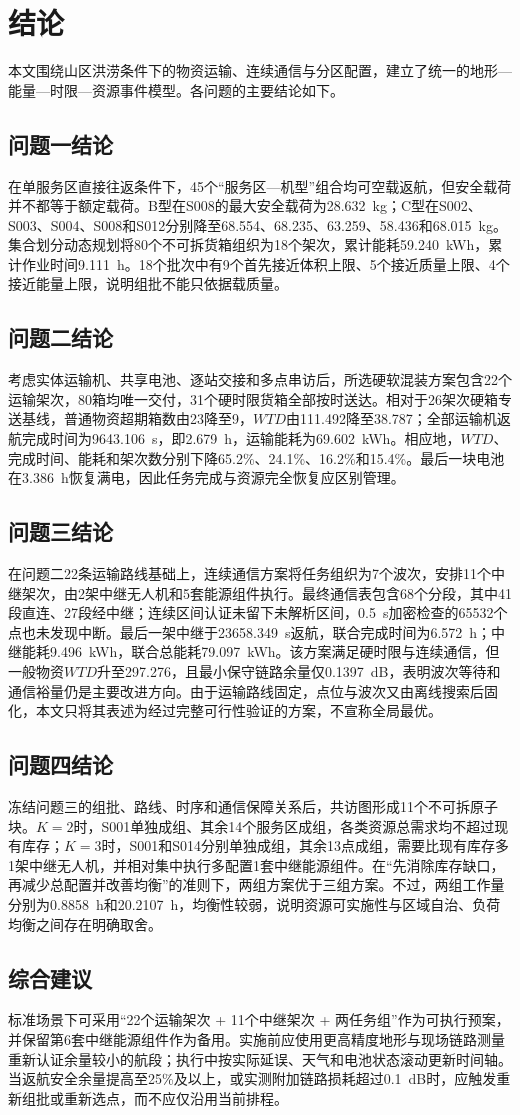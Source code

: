 \section{结论}
本文围绕山区洪涝条件下的物资运输、连续通信与分区配置，建立了统一的地形—能量—时限—资源事件模型。各问题的主要结论如下。

\subsection{问题一结论}
在单服务区直接往返条件下，45个“服务区—机型”组合均可空载返航，但安全载荷并不都等于额定载荷。B型在S008的最大安全载荷为28.632~kg；C型在S002、S003、S004、S008和S012分别降至68.554、68.235、63.259、58.436和68.015~kg。集合划分动态规划将80个不可拆货箱组织为18个架次，累计能耗59.240~kWh，累计作业时间9.111~h。18个批次中有9个首先接近体积上限、5个接近质量上限、4个接近能量上限，说明组批不能只依据载质量。

\subsection{问题二结论}
考虑实体运输机、共享电池、逐站交接和多点串访后，所选硬软混装方案包含22个运输架次，80箱均唯一交付，31个硬时限货箱全部按时送达。相对于26架次硬箱专送基线，普通物资超期箱数由23降至9，$WTD$由111.492降至38.787；全部运输机返航完成时间为9643.106~s，即2.679~h，运输能耗为69.602~kWh。相应地，$WTD$、完成时间、能耗和架次数分别下降65.2\%、24.1\%、16.2\%和15.4\%。最后一块电池在3.386~h恢复满电，因此任务完成与资源完全恢复应区别管理。

\subsection{问题三结论}
在问题二22条运输路线基础上，连续通信方案将任务组织为7个波次，安排11个中继架次，由2架中继无人机和5套能源组件执行。最终通信表包含68个分段，其中41段直连、27段经中继；连续区间认证未留下未解析区间，0.5~s加密检查的65532个点也未发现中断。最后一架中继于23658.349~s返航，联合完成时间为6.572~h；中继能耗9.496~kWh，联合总能耗79.097~kWh。该方案满足硬时限与连续通信，但一般物资$WTD$升至297.276，且最小保守链路余量仅0.1397~dB，表明波次等待和通信裕量仍是主要改进方向。由于运输路线固定，点位与波次又由离线搜索后固化，本文只将其表述为经过完整可行性验证的方案，不宣称全局最优。

\subsection{问题四结论}
冻结问题三的组批、路线、时序和通信保障关系后，共访图形成11个不可拆原子块。$K=2$时，S001单独成组、其余14个服务区成组，各类资源总需求均不超过现有库存；$K=3$时，S001和S014分别单独成组，其余13点成组，需要比现有库存多1架中继无人机，并相对集中执行多配置1套中继能源组件。在“先消除库存缺口，再减少总配置并改善均衡”的准则下，两组方案优于三组方案。不过，两组工作量分别为0.8858~h和20.2107~h，均衡性较弱，说明资源可实施性与区域自治、负荷均衡之间存在明确取舍。

\subsection{综合建议}
标准场景下可采用“22个运输架次 + 11个中继架次 + 两任务组”作为可执行预案，并保留第6套中继能源组件作为备用。实施前应使用更高精度地形与现场链路测量重新认证余量较小的航段；执行中按实际延误、天气和电池状态滚动更新时间轴。当返航安全余量提高至25\%及以上，或实测附加链路损耗超过0.1~dB时，应触发重新组批或重新选点，而不应仅沿用当前排程。
